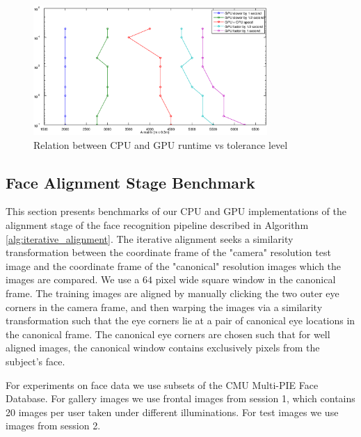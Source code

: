 \documentclass[10pt,twocolumn,letterpaper]{article}
\begin{document}
\begin{figure}
\begin{center}
\includegraphics[width=3.5in]{results/random_data/size_vs_speed_crossover_ratio_3}
\end{center}
\caption{Relation between CPU and GPU runtime vs tolerance level}
\label{fig:random_data2}
\end{figure}



\subsection{Face Alignment Stage Benchmark} 
\label{sec:alignment_benchmark}
This section presents benchmarks of our CPU and GPU implementations of the
alignment stage of the face recognition pipeline described in Algorithm
\ref{alg:iterative_alignment}.  The iterative alignment seeks a similarity
transformation between the coordinate frame of the "camera" resolution test
image and the coordinate frame of the "canonical" resolution images which the
images are compared.  We use a $64$ pixel wide square window in the canonical
frame.  The training images are aligned by manually clicking the two outer eye
corners in the camera frame, and then warping the images via a similarity
transformation such that the eye corners lie at a pair of canonical eye
locations in the canonical frame.  The canonical eye corners are chosen such
that for well aligned images, the canonical window contains exclusively pixels
from the subject's face. 

For experiments on face data we use subsets of the CMU Multi-PIE Face Database.
For gallery images we use frontal images from session 1, which contains 20
images per user taken under different illuminations. For test images we use
images from session 2.  
\end{document}

